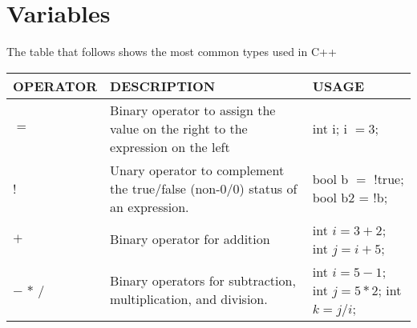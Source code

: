 \documentclass{article}
\begin{document}
\section{Variables}
The table that follows shows the most common types used in C++
\begin{center}
	\begin{tabularx}{\textwidth}{
			| >{\raggedright\arraybackslash}X
			| >{\raggedright\arraybackslash}X
			| >{\raggedright\arraybackslash}X |
		}
		\hline
		\textbf{OPERATOR}                               & \textbf{DESCRIPTION}                                                                                                                                                                                                                                                                                    & \textbf{USAGE}                                                               \\
		\hline
		$=$                                              & Binary operator to assign the value on the right to the expression on the left                                                                                                                                                                                                                          & int i; \newline i $=$3;                                                        \\
		\hline
		!                                               & Unary operator to complement the true/false (non-0/0) status of an expression.                                                                                                                                                                                                                          & bool b $=$ !true; \newline bool b2 = !b;                                       \\
		\hline
		$+$                                             & Binary operator for addition                                                                                                                                                                                                                                                                            & int $i = 3+2$; \newline int $j = i+5$;                                           \\
		\hline
		$-$ \newline $*$ \newline $/$                   & Binary operators for subtraction, multiplication, and division.                                                                                                                                                                                                                                         & int $i = 5-1$; \newline int $j = 5*2$; \newline int $k = j/i$;                     \\

\end{tabularx}
\end{center}
\end{document}
